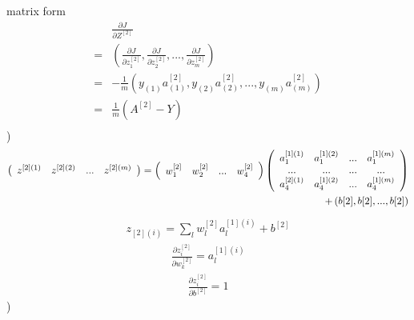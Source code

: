 \documentclass[a4paper]{article}
\begin{document}
matrix form
\begin{align*}
	&\frac{\partial J}{\partial Z^{[2]}} \\
  = & (\frac{\partial J}{\partial z_{1}^{[2]}}, \frac{\partial J}{\partial z_{2}^{[2]}},...,\frac{\partial J}{\partial z_{m}^{[2]}} ) \\
  = & -\frac{1}{m} (y_{(1)} a_{(1)}^{[2]}, y_{(2)} a_{(2)}^{[2]},...,y_{(m)} a_{(m)}^{[2]})\\ 	
  = & \frac{1}{m} (A^{[2]} - Y)\\
\end{align*}
)
\begin{align*}
\left( \begin{array} {c c c c}
z^{[2](1)} & z^{[2](2)} & ... & z^{[2](m)} \\
\end{array} \right)
=\left( \begin{array} {c c c c}
w_1^{[2]} & w_2^{[2]} & ... & w_4^{[2]} \\
\end{array} \right)
\left( \begin{array} {c c c c}
a_1^{[1](1)} & a_1^{[1](2)} & ... & a_1^{[1](m)} \\
...& ...& ...&...\\
a_4^{[2](1)} & a_4^{[1](2)} & ... & a_4^{[1](m)} \\
\end{array} \right)\\
+\left( b[2], b[2], ... ,b[2]\right)
\end{align*}
\begin{align*}
	z_{[2](i)} = \sum_l w_l^{[2]} a_l^{[1](i)} + b^{[2]}
\end{align*}
\begin{align*}
	\frac{\partial z_{i}^{[2]}}{ \partial w_k^{[2]}} = a_l ^{[1](i)}
\end{align*}
\begin{align*}
	\frac{\partial z_{i}^{[2]}}{\partial  b^{[2]}} = 1
\end{align*}
)
\end{document}
